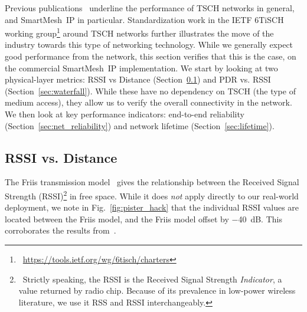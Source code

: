 \documentclass{elsarticle}
\newcommand{\smip}                {SmartMesh~IP\xspace}
\begin{document}
Previous publications~\cite{watteyne16peach,watteyne10mitigating,watteyne09reliability,watteyne15industrial} underline the performance of TSCH networks in general, and \smip in particular.
Standardization work in the IETF 6TiSCH working group\footnote{~\url{https://tools.ietf.org/wg/6tisch/charters}} around TSCH networks further illustrates the move of the industry towards this type of networking technology.
While we generally expect good performance from the network, this section verifies that this is the case, on the commercial \smip implementation.
We start by looking at two physical-layer metrics: RSSI vs Distance (Section~\ref{sec:rssi_distance}) and PDR vs. RSSI (Section~\ref{sec:waterfall}).
While these have no dependency on TSCH (the type of medium access), they allow us to verify the overall connectivity in the network.
We then look at key performance indicators: end-to-end reliability (Section~\ref{sec:net_reliability}) and network lifetime (Section~\ref{sec:lifetime}).

\subsection{RSSI vs. Distance}
\label{sec:rssi_distance}

The Friis transmission model~\cite{saunders07antennas} gives the relationship between the Received Signal Strength (RSSI)\footnote{~Strictly speaking, the RSSI is the Received Signal Strength \textit{Indicator}, a value returned by radio chip. Because of its prevalence in low-power wireless literature, we use it RSS and RSSI interchangeably.} in free space.
While it does \textit{not} apply directly to our real-world deployment, we note in Fig.~\ref{fig:pister_hack} that the individual RSSI values are located between the Friis model, and the Friis model offset by $-$40~dB.
This corroborates the results from~\cite{zats10wireless}.
\end{document}
